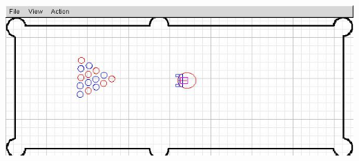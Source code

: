 \documentclass[30pt,landscape,magscalefonts]{foils}
\newcommand{\foilheadc}[1]{\foilhead{\Large \textcolor{myred}{#1}}\vspace*{-2em}}
\def\movieroot{file:///mnt/win/users/gerkey/videos}
\begin{document}
\foilheadc{Another movie}
\label{lastpage}
\vfill
\begin{center}
\href{\movieroot/stage-table.mpg}{\includegraphics[width=\textwidth]{stage-table.jpg}}
\end{center}
\vfill
\end{document}
